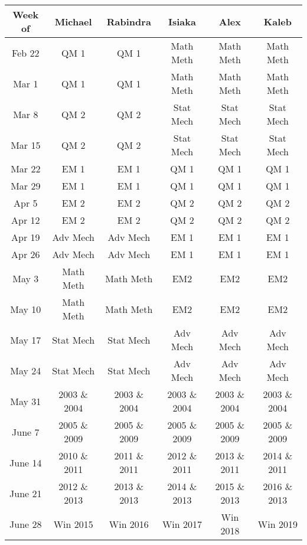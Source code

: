 \documentclass[]{article}
\begin{document}
\begin{center}
    \begin{tabular}{c|c|c|c|c|c}
        \hline
        Week of & Michael & Rabindra & Isiaka & Alex & Kaleb \\
        \hline
        \hline
        Feb 22 & QM 1 & QM 1 & Math Meth & Math Meth & Math Meth \\
        \hline
        Mar 1 & QM 1 & QM 1 & Math Meth & Math Meth & Math Meth \\
        \hline
        Mar 8 & QM 2 & QM 2 & Stat Mech & Stat Mech & Stat Mech \\
        \hline
        Mar 15 & QM 2 & QM 2 & Stat Mech & Stat Mech & Stat Mech \\
        \hline
        Mar 22 & EM 1 & EM 1 & QM 1 & QM 1 & QM 1 \\
        \hline
        Mar 29 & EM 1 & EM 1 & QM 1 & QM 1 & QM 1 \\
        \hline
        Apr 5 & EM 2 & EM 2 & QM 2 & QM 2 & QM 2 \\
        \hline
        Apr 12 & EM 2 & EM 2 & QM 2 & QM 2 & QM 2 \\
        \hline
        Apr 19 & Adv Mech & Adv Mech & EM 1 & EM 1 & EM 1 \\
        \hline
        Apr 26 & Adv Mech & Adv Mech & EM 1 & EM 1 & EM 1 \\
        \hline
        May 3 & Math Meth & Math Meth & EM2 & EM2 & EM2 \\
        \hline
        May 10 & Math Meth & Math Meth & EM2 & EM2 & EM2 \\
        \hline
        May 17 & Stat Mech & Stat Mech & Adv Mech & Adv Mech & Adv Mech \\
        \hline
        May 24 & Stat Mech & Stat Mech & Adv Mech & Adv Mech & Adv Mech \\
        \hline
        May 31 & 2003 \& 2004 & 2003 \& 2004 & 2003 \& 2004 & 2003 \& 2004 & 2003 \& 2004 \\
        \hline
        June 7 & 2005 \& 2009 & 2005 \& 2009 & 2005 \& 2009 & 2005 \& 2009 & 2005 \& 2009 \\
        \hline
        June 14 & 2010 \& 2011 & 2011 \& 2011 & 2012 \& 2011 & 2013 \& 2011 & 2014 \& 2011 \\
        \hline
        June 21 & 2012 \& 2013 & 2013 \& 2013 & 2014 \& 2013 & 2015 \& 2013 & 2016 \& 2013 \\
        \hline
        June 28 & Win 2015 & Win 2016 & Win 2017 & Win 2018 & Win 2019 \\

\end{tabular}
\end{center}
\end{document}
